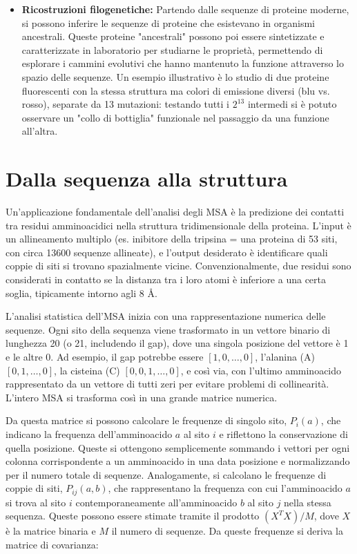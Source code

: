 \begin{itemize}
    \item \textbf{Ricostruzioni filogenetiche:} Partendo dalle sequenze di proteine moderne, si possono inferire le sequenze di proteine che esistevano in organismi ancestrali. Queste proteine "ancestrali" possono poi essere sintetizzate e caratterizzate in laboratorio per studiarne le proprietà, permettendo di esplorare i cammini evolutivi che hanno mantenuto la funzione attraverso lo spazio delle sequenze. Un esempio illustrativo è lo studio di due proteine fluorescenti con la stessa struttura ma colori di emissione diversi (blu vs. rosso), separate da 13 mutazioni: testando tutti i $2^{13}$ intermedi si è potuto osservare un "collo di bottiglia" funzionale nel passaggio da una funzione all'altra.
\end{itemize}


\section{Dalla sequenza alla struttura}
Un'applicazione fondamentale dell'analisi degli MSA è la predizione dei contatti tra residui amminoacidici nella struttura tridimensionale della proteina. L'input è un allineamento multiplo (es. inibitore della tripsina = una proteina di 53 siti, con circa 13600 sequenze allineate), e l'output desiderato è identificare quali coppie di siti si trovano spazialmente vicine. Convenzionalmente, due residui sono considerati in contatto se la distanza tra i loro atomi è inferiore a una certa soglia, tipicamente intorno agli $8 \text{ \AA}$.

L'analisi statistica dell'MSA inizia con una rappresentazione numerica delle sequenze. Ogni sito della sequenza viene trasformato in un vettore binario di lunghezza 20 (o 21, includendo il gap), dove una singola posizione del vettore è 1 e le altre 0. Ad esempio, il gap potrebbe essere $[1,0,\dots,0]$, l'alanina (A) $[0,1,\dots,0]$, la cisteina (C) $[0,0,1,\dots,0]$, e così via, con l'ultimo amminoacido rappresentato da un vettore di tutti zeri per evitare problemi di collinearità. L'intero MSA si trasforma così in una grande matrice numerica.

Da questa matrice si possono calcolare le frequenze di singolo sito, $P_i(a)$, che indicano la frequenza dell'amminoacido $a$ al sito $i$ e riflettono la conservazione di quella posizione. Queste si ottengono semplicemente sommando i vettori per ogni colonna corrispondente a un amminoacido in una data posizione e normalizzando per il numero totale di sequenze.
Analogamente, si calcolano le frequenze di coppie di siti, $P_{ij}(a,b)$, che rappresentano la frequenza con cui l'amminoacido $a$ si trova al sito $i$ contemporaneamente all'amminoacido $b$ al sito $j$ nella stessa sequenza. Queste possono essere stimate tramite il prodotto $(X^T X) / M$, dove $X$ è la matrice binaria e $M$ il numero di sequenze. Da queste frequenze si deriva la matrice di covarianza:

